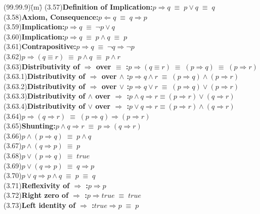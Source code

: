 \documentclass[12pt, fleqn, leqno]{article}
\newcommand{\lgap}{2pt}                             %
\newcommand{\equivs}{\ensuremath{\;\equiv\;}}       %
\newcommand{\impl}{\ensuremath{\Rightarrow}}        %
\newcommand{\foll}{\ensuremath{\Leftarrow}}         %
\begin{document}
\begin{tabbing}
(99.99.9)\;\=(m)\;\=\kill
(3.57)\>\textbf{Definition of Implication:}\quad $p\impl q \equivs p\lor q \equivs q$\\[\lgap]
(3.58)\>\textbf{Axiom, Consequence:}\quad $p\foll q \equivs q\impl p$\\[\lgap]
(3.59)\>\textbf{Implication:}\quad $p\impl q \equivs \neg p \lor q$\\[\lgap]
(3.60)\>\textbf{Implication:}\quad $p\impl q \equivs p\land q \equivs p$\\[\lgap]
(3.61)\>\textbf{Contrapositive:}\quad $p\impl q \equivs \neg q\impl \neg p$\\[\lgap]
(3.62)\>$p\impl (q\equiv r) \equivs p\land q\equivs p\land r$\\[\lgap]
(3.63)\>\textbf{Distributivity of $\impl$ over $\equiv$ :}\quad $p\impl (q\equiv r)\equivs (p\impl q)\equivs (p\impl r)$\\[\lgap]
(3.63.1)\>\textbf{Distributivity of $\impl$ over $\land$ :}\quad $p\impl q\land r\equivs (p\impl q)\land (p\impl r)$\\[\lgap]
(3.63.2)\>\textbf{Distributivity of $\impl$ over $\lor$ :}\quad $p\impl q\lor r\equivs (p\impl q)\lor (p\impl r)$\\[\lgap]
(3.63.3)\>\textbf{Distributivity of $\land$ over $\impl$ :}\quad $p\land q\impl r \equiv (p\impl r) \lor (q\impl r)$\\[\lgap]
(3.63.4)\>\textbf{Distributivity of $\lor$ over $\impl$ :}\quad $p\lor q\impl r \equiv (p\impl r) \land (q\impl r)$\\[\lgap]
(3.64)\>$p\impl (q\impl r) \equivs (p\impl q)\impl (p\impl r)$\\[\lgap]
(3.65)\>\textbf{Shunting:}\quad $p\land q\impl r\equivs p\impl (q\impl r)$\\[\lgap]
(3.66)\>$p\land (p\impl q) \equivs p\land q$\\[\lgap]
(3.67)\>$p\land (q\impl p) \equivs p$\\[\lgap]
(3.68)\>$p\lor (p\impl q) \equivs true$\\[\lgap]
(3.69)\>$p\lor (q\impl p) \equivs q\impl p$\\[\lgap]
(3.70)\>$p\lor q \impl p\land q \equivs p \equivs q$\\[\lgap]
(3.71)\>\textbf{Reflexivity of $\impl$ :}\quad $p\impl p$\\[\lgap]
(3.72)\>\textbf{Right zero of $\impl$ :}\quad $p\impl true \equivs true$\\[\lgap]
(3.73)\>\textbf{Left identity of $\impl$ :}\quad $true\impl p \equivs p$\\[\lgap]

\end{tabbing}
\end{document}
